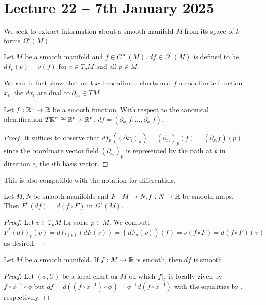 \section{Lecture 22 -- 7th January 2025}\label{sec: lecture 22}
We seek to extract information about a smooth manifold $M$ from its space of $k$-forms $\Omega^{k}(M)$. 
\begin{definition}\label{def: form of a function}
    Let $M$ be a smooth manifold and $f\in C^{\infty}(M)$. $df\in\Omega^{1}(M)$ is defined to be $df_{p}(v)=v(f)$ for $v\in T_{p}M$ and all $p\in M$. 
\end{definition}
We can in fact show that on local coordinate charts and $f$ a coordinate function $x_{i}$, the $dx_{i}$ are dual to $\partial_{x_{i}}\in TM$. 
\begin{lemma}\label{lem: dual coordinates on Rn}
    Let $f:\mathbb{R}^{n}\to\mathbb{R}$ be a smooth function. With respect to the canonical identification $T\mathbb{R}^{n}\cong\mathbb{R}^{n}\times\mathbb{R}^{n}$, $df=(\partial_{x_{1}}f,\dots,\partial_{x_{n}}f)$. 
\end{lemma}
\begin{proof}
    It suffices to observe that $df_{p}((\partial x_{i})_{p})=(\partial_{x_{i}})_{p}(f)=(\partial_{x_{i}}f)(p)$ since the coordinate vector field $(\partial_{x_{i}})_{p}$ is represented by the path at $p$ in direction $e_{i}$ the $i$th basis vector. 
\end{proof}
This is also compatible with the notation for differentials. 
\begin{lemma}\label{lem: notation for differentials}
    Let $M,N$ be smooth manifolds and $F:M\to N,f:N\to\mathbb{R}$ be smooth maps. Then $F^{*}(df)=d(f\circ F)$ in $\Omega^{1}(M)$. 
\end{lemma}
\begin{proof}
    Let $v\in T_{p}M$ for some $p\in M$. We compute 
    $$F^{*}(df)_{p}(v)=df_{F(p)}(dF(v))=(dF_{p}(v))(f)=v(f\circ F)=d(f\circ F)(v)$$
    as desired. 
\end{proof}
\begin{corollary}\label{corr: form of smooth function is smooth}
    Let $M$ be a smooth manifold. If $f:M\to\mathbb{R}$ is smooth, then $df$ is smooth. 
\end{corollary}
\begin{proof}
    Let $(\phi,U)$ be a local chart on $M$ on which $f|_{U}$ is locally given by $f\circ\phi^{-1}\circ \phi$ but $df=d((f\circ\phi^{-1})\circ\phi)=\phi^{-1}d(f\circ\phi^{-1})$ with the equalities by , respectively. 
\end{proof}

